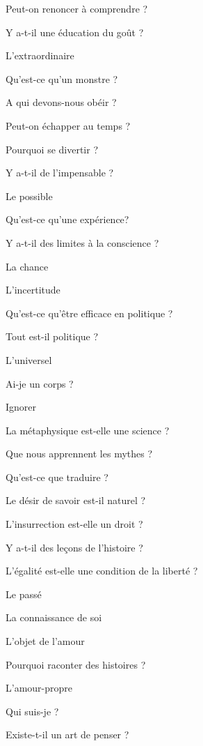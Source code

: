 \documentclass[a4paper,12pt]{article}
\begin{document}
\begin{multicols}{2}
\noindent Peut-on renoncer à comprendre ? \par
\noindent Y a-t-il une éducation du goût ? \par
\noindent L'extraordinaire \par
\noindent Qu'est-ce qu'un monstre ? \par
\noindent A qui devons-nous obéir ? \par
\noindent Peut-on échapper au temps ? \par
\noindent Pourquoi se divertir ? \par
\noindent Y a-t-il de l'impensable ? \par
\noindent Le possible \par
\noindent Qu'est-ce qu'une expérience? \par
\noindent Y a-t-il des limites à la conscience ? \par
\noindent La chance \par
\noindent L'incertitude \par
\noindent Qu'est-ce qu'être efficace en politique ? \par
\noindent Tout est-il politique ? \par
\noindent L'universel \par
\noindent Ai-je un corps ? \par
\noindent Ignorer \par
\noindent La métaphysique est-elle une science ? \par
\noindent Que nous apprennent les mythes ? \par
\noindent Qu'est-ce que traduire ? \par
\noindent Le désir de savoir est-il naturel ? \par
\noindent L'insurrection est-elle un droit ? \par
\noindent Y a-t-il des leçons de l'histoire ? \par
\noindent L'égalité est-elle une condition de la liberté ? \par
\noindent Le passé \par
\noindent La connaissance de soi \par
\noindent L'objet de l'amour \par
\noindent Pourquoi raconter des histoires ? \par
\noindent L'amour-propre \par
\noindent Qui suis-je ? \par
\noindent Existe-t-il un art de penser ? \par

\end{multicols}
\end{document}
